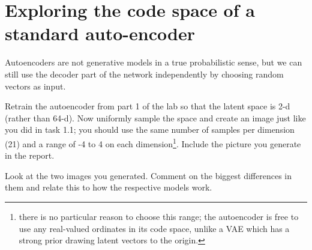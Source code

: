 \documentclass[a4paper]{article}
\begin{document}
\section{Exploring the code space of a standard auto-encoder}\label{ae}
Autoencoders are not generative models in a true probabilistic sense, but we can still use the decoder part of the network independently by choosing random vectors as input. 

\begin{tcolorbox}[title=2.1 Systematically sample an Autoencoder (2 marks)]
Retrain the autoencoder from part 1 of the lab so that the latent space is 2-d (rather than 64-d). Now uniformly sample the space and create an image just like you did in task 1.1; you should use the same number of samples per dimension (21) and a range of -4 to 4 on each dimension\footnote{there is no particular reason to choose this range; the autoencoder is free to use any real-valued ordinates in its code space, unlike a VAE which has a strong prior drawing latent vectors to the origin.}. Include the picture you generate in the report.
\end{tcolorbox}

\begin{tcolorbox}[title=2.2 Compare the latent spaces of the VAE and autoencoder (1 mark)]
Look at the two images you generated. Comment on the biggest differences in them and relate this to how the respective models work.
\end{tcolorbox}
\end{document}
